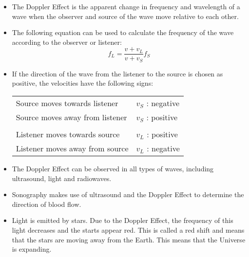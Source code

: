 \begin{itemize}
\item 
{The Doppler Effect is the apparent change in frequency and wavelength of a wave when the observer and source of the wave move relative to each other.}
\item {The following equation can be used to calculate the frequency of the wave according to the observer or listener:
$$f_L=\frac{v + v_L}{v + v_S}f_S$$
}
\item  {
If the direction of the wave from the listener to the source is chosen as positive, the velocities have the following signs:
\begin{center}
\begin{tabular}{|ll|}
\hline
Source moves towards listener & $v_S$ : negative\\
Source moves away from listener & $v_S$ : positive\\
    &   \\
Listener moves towards source & $v_L$ : positive\\
Listener moves away from source & $v_L$ : negative\\
\hline
\end{tabular}
\end{center}
}
\item{The Doppler Effect can be observed in all types of waves, including ultrasound, light and radiowaves.}
\item{Sonography makes use of ultrasound and the Doppler Effect to determine the direction of blood flow.}
\item{Light is emitted by stars. Due to the Doppler Effect, the frequency of this light decreases and the starts appear red. This is called a red shift and means that the stars are moving away from the Earth. This means that the Universe is expanding.}
\end{itemize}

